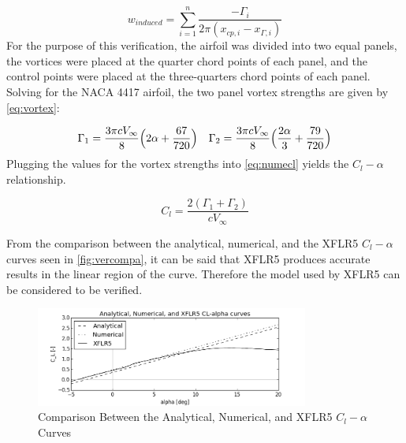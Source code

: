 \begin{equation}
\label{eq:indu}
    w_{induced} = \sum\limits_{i=1}^n \frac{-\Gamma_{i}}{2\pi(x_{cp,i}-x_{\Gamma,i})}
\end{equation}
For the purpose of this verification, the airfoil was divided into two equal panels, the vortices were placed at the quarter chord points of each panel, and the control points were placed at the three-quarters chord points of each panel. Solving for the NACA 4417 airfoil, the two panel vortex strengths are given by \autoref{eq:vortex}:

\begin{equation}
\label{eq:vortex}
    \Gamma_{1} = \frac{3\pi c V_{\infty}}{8}\Big{(}2\alpha + \frac{67}{720}\Big{)} \quad \Gamma_{2} = \frac{3\pi c V_{\infty}}{8}\Big{(}\frac{2\alpha}{3} + \frac{79}{720}\Big{)}
\end{equation}
Plugging the values for the vortex strengths into \autoref{eq:numecl} yields the $C_{l}-\alpha$ relationship.

\begin{equation}
\label{eq:numecl}
    C_{l} = \frac{2(\Gamma_{1} + \Gamma_{2})}{cV_{\infty}}
\end{equation}

From the comparison between the analytical, numerical, and the XFLR5 $C_{l}-\alpha$ curves seen in \autoref{fig:vercompa}, it can be said that XFLR5 produces accurate results in the linear region of the curve. Therefore the model used by XFLR5 can be considered to be verified.

\begin{figure}[H]
    \centering
    \includegraphics[width=0.8\textwidth]{Aerodynamics/Figures/vercomp}
    \caption{Comparison Between the Analytical, Numerical, and XFLR5 $C_{l}-\alpha$ Curves}
    \label{fig:vercompa}
\end{figure}



 
